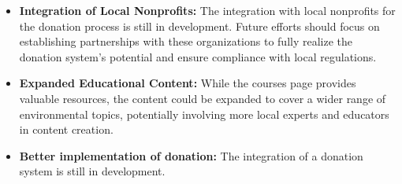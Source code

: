 \begin{itemize}
    \item \textbf{Integration of Local Nonprofits:} The integration with local nonprofits for the donation process is still in development. Future efforts should focus on establishing partnerships with these organizations to fully realize the donation system's potential and ensure compliance with local regulations.
    \item \textbf{Expanded Educational Content:} While the courses page provides valuable resources, the content could be expanded to cover a wider range of environmental topics, potentially involving more local experts and educators in content creation.
    \item \textbf{Better implementation of donation:} The integration of a donation system is still in development.    
\end{itemize}

